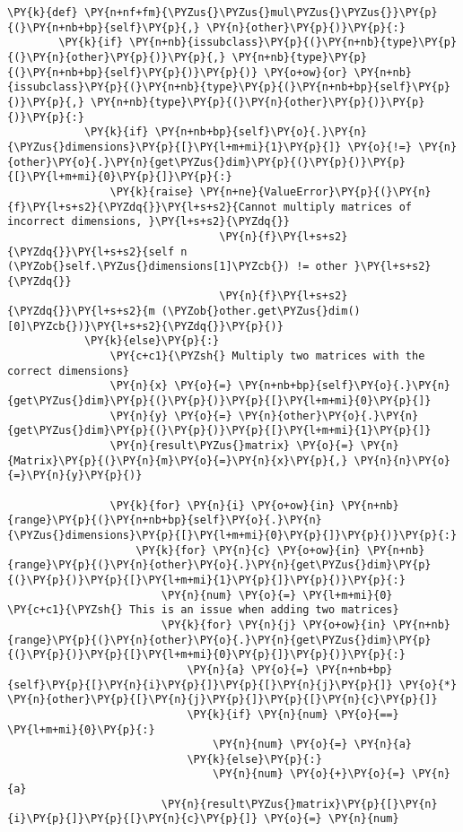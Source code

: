 \begin{Verbatim}[commandchars=\\\{\}]
    \PY{k}{def} \PY{n+nf+fm}{\PYZus{}\PYZus{}mul\PYZus{}\PYZus{}}\PY{p}{(}\PY{n+nb+bp}{self}\PY{p}{,} \PY{n}{other}\PY{p}{)}\PY{p}{:}
        \PY{k}{if} \PY{n+nb}{issubclass}\PY{p}{(}\PY{n+nb}{type}\PY{p}{(}\PY{n}{other}\PY{p}{)}\PY{p}{,} \PY{n+nb}{type}\PY{p}{(}\PY{n+nb+bp}{self}\PY{p}{)}\PY{p}{)} \PY{o+ow}{or} \PY{n+nb}{issubclass}\PY{p}{(}\PY{n+nb}{type}\PY{p}{(}\PY{n+nb+bp}{self}\PY{p}{)}\PY{p}{,} \PY{n+nb}{type}\PY{p}{(}\PY{n}{other}\PY{p}{)}\PY{p}{)}\PY{p}{:}
            \PY{k}{if} \PY{n+nb+bp}{self}\PY{o}{.}\PY{n}{\PYZus{}dimensions}\PY{p}{[}\PY{l+m+mi}{1}\PY{p}{]} \PY{o}{!=} \PY{n}{other}\PY{o}{.}\PY{n}{get\PYZus{}dim}\PY{p}{(}\PY{p}{)}\PY{p}{[}\PY{l+m+mi}{0}\PY{p}{]}\PY{p}{:}
                \PY{k}{raise} \PY{n+ne}{ValueError}\PY{p}{(}\PY{n}{f}\PY{l+s+s2}{\PYZdq{}}\PY{l+s+s2}{Cannot multiply matrices of incorrect dimensions, }\PY{l+s+s2}{\PYZdq{}}
                                 \PY{n}{f}\PY{l+s+s2}{\PYZdq{}}\PY{l+s+s2}{self n (\PYZob{}self.\PYZus{}dimensions[1]\PYZcb{}) != other }\PY{l+s+s2}{\PYZdq{}}
                                 \PY{n}{f}\PY{l+s+s2}{\PYZdq{}}\PY{l+s+s2}{m (\PYZob{}other.get\PYZus{}dim()[0]\PYZcb{})}\PY{l+s+s2}{\PYZdq{}}\PY{p}{)}
            \PY{k}{else}\PY{p}{:}
                \PY{c+c1}{\PYZsh{} Multiply two matrices with the correct dimensions}
                \PY{n}{x} \PY{o}{=} \PY{n+nb+bp}{self}\PY{o}{.}\PY{n}{get\PYZus{}dim}\PY{p}{(}\PY{p}{)}\PY{p}{[}\PY{l+m+mi}{0}\PY{p}{]}
                \PY{n}{y} \PY{o}{=} \PY{n}{other}\PY{o}{.}\PY{n}{get\PYZus{}dim}\PY{p}{(}\PY{p}{)}\PY{p}{[}\PY{l+m+mi}{1}\PY{p}{]}
                \PY{n}{result\PYZus{}matrix} \PY{o}{=} \PY{n}{Matrix}\PY{p}{(}\PY{n}{m}\PY{o}{=}\PY{n}{x}\PY{p}{,} \PY{n}{n}\PY{o}{=}\PY{n}{y}\PY{p}{)}

                \PY{k}{for} \PY{n}{i} \PY{o+ow}{in} \PY{n+nb}{range}\PY{p}{(}\PY{n+nb+bp}{self}\PY{o}{.}\PY{n}{\PYZus{}dimensions}\PY{p}{[}\PY{l+m+mi}{0}\PY{p}{]}\PY{p}{)}\PY{p}{:}
                    \PY{k}{for} \PY{n}{c} \PY{o+ow}{in} \PY{n+nb}{range}\PY{p}{(}\PY{n}{other}\PY{o}{.}\PY{n}{get\PYZus{}dim}\PY{p}{(}\PY{p}{)}\PY{p}{[}\PY{l+m+mi}{1}\PY{p}{]}\PY{p}{)}\PY{p}{:}
                        \PY{n}{num} \PY{o}{=} \PY{l+m+mi}{0}  \PY{c+c1}{\PYZsh{} This is an issue when adding two matrices}
                        \PY{k}{for} \PY{n}{j} \PY{o+ow}{in} \PY{n+nb}{range}\PY{p}{(}\PY{n}{other}\PY{o}{.}\PY{n}{get\PYZus{}dim}\PY{p}{(}\PY{p}{)}\PY{p}{[}\PY{l+m+mi}{0}\PY{p}{]}\PY{p}{)}\PY{p}{:}
                            \PY{n}{a} \PY{o}{=} \PY{n+nb+bp}{self}\PY{p}{[}\PY{n}{i}\PY{p}{]}\PY{p}{[}\PY{n}{j}\PY{p}{]} \PY{o}{*} \PY{n}{other}\PY{p}{[}\PY{n}{j}\PY{p}{]}\PY{p}{[}\PY{n}{c}\PY{p}{]}
                            \PY{k}{if} \PY{n}{num} \PY{o}{==} \PY{l+m+mi}{0}\PY{p}{:}
                                \PY{n}{num} \PY{o}{=} \PY{n}{a}
                            \PY{k}{else}\PY{p}{:}
                                \PY{n}{num} \PY{o}{+}\PY{o}{=} \PY{n}{a}
                        \PY{n}{result\PYZus{}matrix}\PY{p}{[}\PY{n}{i}\PY{p}{]}\PY{p}{[}\PY{n}{c}\PY{p}{]} \PY{o}{=} \PY{n}{num}


\end{Verbatim}
